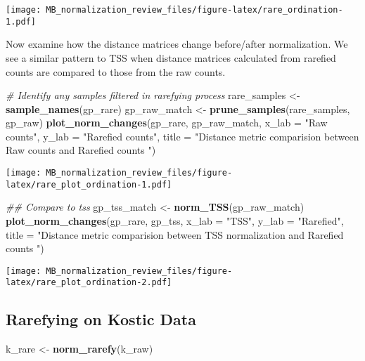 \documentclass[
]{book}
\newenvironment{Shaded}{\begin{snugshade}}{\end{snugshade}}
\newcommand{\CommentTok}[1]{\textcolor[rgb]{0.56,0.35,0.01}{\textit{#1}}}
\newcommand{\DataTypeTok}[1]{\textcolor[rgb]{0.13,0.29,0.53}{#1}}
\newcommand{\KeywordTok}[1]{\textcolor[rgb]{0.13,0.29,0.53}{\textbf{#1}}}
\newcommand{\NormalTok}[1]{#1}
\newcommand{\StringTok}[1]{\textcolor[rgb]{0.31,0.60,0.02}{#1}}
\begin{document}
\texttt{[image: MB\_normalization\_review\_files/figure-latex/rare\_ordination-1.pdf]}

Now examine how the distance matrices change before/after normalization. We see a similar pattern to TSS when distance matrices calculated from rarefied counts are compared to those from the raw counts.

\begin{Shaded}
\begin{Highlighting}[]
\CommentTok{\# Identify any samples filtered in rarefying process }
\NormalTok{rare\_samples \textless{}{-}}\StringTok{ }\KeywordTok{sample\_names}\NormalTok{(gp\_rare)}
\NormalTok{gp\_raw\_match \textless{}{-}}\StringTok{ }\KeywordTok{prune\_samples}\NormalTok{(rare\_samples, gp\_raw)}
\KeywordTok{plot\_norm\_changes}\NormalTok{(gp\_rare, gp\_raw\_match,}
                  \DataTypeTok{x\_lab =} \StringTok{"Raw counts"}\NormalTok{, }\DataTypeTok{y\_lab =} \StringTok{"Rarefied counts"}\NormalTok{, }
                  \DataTypeTok{title =} \StringTok{"Distance metric comparision between Raw counts and Rarefied counts "}\NormalTok{)}
\end{Highlighting}
\end{Shaded}

\texttt{[image: MB\_normalization\_review\_files/figure-latex/rare\_plot\_ordination-1.pdf]}

\begin{Shaded}
\begin{Highlighting}[]
\CommentTok{\#\# Compare to tss}
\NormalTok{gp\_tss\_match \textless{}{-}}\StringTok{ }\KeywordTok{norm\_TSS}\NormalTok{(gp\_raw\_match)}
\KeywordTok{plot\_norm\_changes}\NormalTok{(gp\_rare, gp\_tss,}
                  \DataTypeTok{x\_lab =} \StringTok{"TSS"}\NormalTok{, }\DataTypeTok{y\_lab =} \StringTok{"Rarefied"}\NormalTok{, }
                  \DataTypeTok{title =} \StringTok{"Distance metric comparision between TSS normalization and Rarefied counts "}\NormalTok{)}
\end{Highlighting}
\end{Shaded}

\texttt{[image: MB\_normalization\_review\_files/figure-latex/rare\_plot\_ordination-2.pdf]}

\hypertarget{rarefying-on-kostic-data}{%
\subsection{Rarefying on Kostic Data}\label{rarefying-on-kostic-data}}

\begin{Shaded}
\begin{Highlighting}[]
\NormalTok{k\_rare \textless{}{-}}\StringTok{ }\KeywordTok{norm\_rarefy}\NormalTok{(k\_raw)}
\end{Highlighting}
\end{Shaded}
\end{document}
